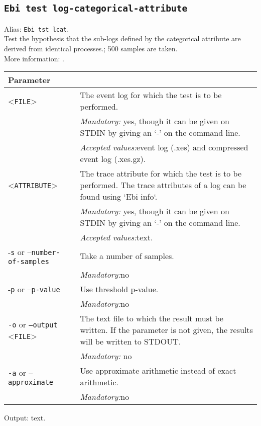{\subsection{\texttt{Ebi test log-categorical-attribute}}
\label{command:Ebi test log-categorical-attribute}
Alias: \texttt{Ebi tst lcat}.\\
Test the hypothesis that the sub-logs defined by the categorical attribute are derived from identical processes.; 500 samples are taken.\\
More information: \cite{DBLP:journals/tkde/LeemansMPH23}.\\
\begin{tabularx}{\linewidth}{lX}
\toprule
Parameter \\\midrule
<\texttt{FILE}>&The event log for which the test is to be performed.\\
&\textit{Mandatory:} \quad yes, though it can be given on STDIN by giving an `-' on the command line.\\
&\textit{Accepted values:}\quad event log (.xes) and compressed event log (.xes.gz).\\
<\texttt{ATTRIBUTE}>&The trace attribute for which the test is to be performed. The trace attributes of a log can be found using `Ebi info`.\\
&\textit{Mandatory:} \quad yes, though it can be given on STDIN by giving an `-' on the command line.\\
&\textit{Accepted values:}\quad text.\\
-\texttt{s} or --\texttt{number-of-samples}
&Take a number of samples.\\
&\textit{Mandatory:}\quad no\\
-\texttt{p} or --\texttt{p-value}
&Use threshold p-value.\\
&\textit{Mandatory:}\quad no\\
\texttt{-o} or \texttt{--output} <\texttt{FILE}> &
The text file to which the result must be written. If the parameter is not given, the results will be written to STDOUT.\\
&\textit{Mandatory:} \quad no\\
\texttt{-a} or \texttt{--approximate} & Use approximate arithmetic instead of exact arithmetic.\\
&\textit{Mandatory:}\quad no\\
\bottomrule
\end{tabularx}
Output: text.
}
